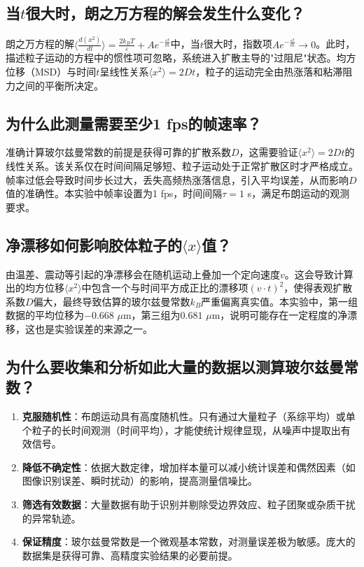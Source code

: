 \documentclass[a4paper]{article}
\begin{document}
\subsection{当$t$很大时，朗之万方程的解会发生什么变化？}

朗之万方程的解$\langle \frac{d(x^2)}{dt} \rangle = \frac{2k_BT}{\varepsilon} + Ae^{-\frac{\varepsilon t}{m}}$中，当$t$很大时，指数项$Ae^{-\frac{\varepsilon t}{m}} \rightarrow 0$。此时，描述粒子运动的方程中的惯性项可忽略，系统进入扩散主导的"过阻尼"状态。均方位移（MSD）与时间$t$呈线性关系$\langle x^2\rangle = 2Dt$，粒子的运动完全由热涨落和粘滞阻力之间的平衡所决定。

\subsection{为什么此测量需要至少1 fps的帧速率？}

准确计算玻尔兹曼常数的前提是获得可靠的扩散系数$D$，这需要验证$\langle x^2\rangle = 2Dt$的线性关系。该关系仅在时间间隔足够短、粒子运动处于正常扩散区时才严格成立。帧率过低会导致时间步长过大，丢失高频热涨落信息，引入平均误差，从而影响$D$值的准确性。本实验中帧率设置为1 fps，时间间隔$\tau = 1$ s，满足布朗运动的观测要求。

\subsection{净漂移如何影响胶体粒子的$\langle x\rangle$值？}

由温差、震动等引起的净漂移会在随机运动上叠加一个定向速度$v$。这会导致计算出的均方位移$\langle x^2\rangle$中包含一个与时间平方成正比的漂移项$(v\cdot t)^2$，使得表观扩散系数$D$偏大，最终导致估算的玻尔兹曼常数$k_B$严重偏离真实值。本实验中，第一组数据的平均位移为$-0.668$ $\mu$m，第三组为$0.681$ $\mu$m，说明可能存在一定程度的净漂移，这也是实验误差的来源之一。

\subsection{为什么要收集和分析如此大量的数据以测算玻尔兹曼常数？}

\begin{enumerate}[label=(\arabic*),leftmargin=3em]
	\item \textbf{克服随机性}：布朗运动具有高度随机性。只有通过大量粒子（系综平均）或单个粒子的长时间观测（时间平均），才能使统计规律显现，从噪声中提取出有效信号。
	\item \textbf{降低不确定性}：依据大数定律，增加样本量可以减小统计误差和偶然因素（如图像识别误差、瞬时扰动）的影响，提高测量信噪比。
	\item \textbf{筛选有效数据}：大量数据有助于识别并剔除受边界效应、粒子团聚或杂质干扰的异常轨迹。
	\item \textbf{保证精度}：玻尔兹曼常数是一个微观基本常数，对测量误差极为敏感。庞大的数据集是获得可靠、高精度实验结果的必要前提。
\end{enumerate}
\end{document}
